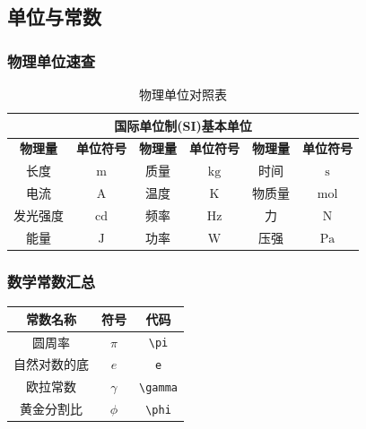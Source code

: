 \documentclass{article}
\begin{document}
\subsection{单位与常数}

\subsubsection{物理单位速查}
\begin{table}[H]
\centering
\renewcommand{\arraystretch}{1.3}
\begin{tabular}{||c|c||c|c||c|c||}
\hline\hline
\multicolumn{6}{||c||}{\textbf{国际单位制(SI)基本单位}} \\
\hline\hline
\textbf{物理量} & \textbf{单位符号} & \textbf{物理量} & \textbf{单位符号} & \textbf{物理量} & \textbf{单位符号} \\
\hline
长度 & $\text{m}$ & 质量 & $\text{kg}$ & 时间 & $\text{s}$ \\
\hline
电流 & $\text{A}$ & 温度 & $\text{K}$ & 物质量 & $\text{mol}$ \\
\hline
发光强度 & $\text{cd}$ & 频率 & $\text{Hz}$ & 力 & $\text{N}$ \\
\hline
能量 & $\text{J}$ & 功率 & $\text{W}$ & 压强 & $\text{Pa}$ \\
\hline\hline
\end{tabular}
\caption{物理单位对照表}
\end{table}

\subsubsection{数学常数汇总}
\begin{center}
\large
\begin{tabular}{@{}ccc@{}}
\toprule
\textbf{常数名称} & \textbf{符号} & \textbf{代码} \\
\midrule
圆周率 & $\pi$ & \verb|\pi| \\
自然对数的底 & $e$ & \verb|e| \\
欧拉常数 & $\gamma$ & \verb|\gamma| \\
黄金分割比 & $\phi$ & \verb|\phi| \\
\bottomrule
\end{tabular}
\end{center}
\end{document}
